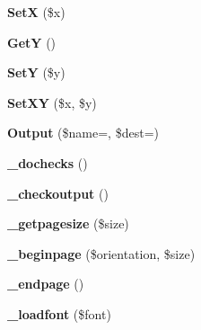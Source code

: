 \begin{DoxyCompactItemize}
\item 
\hypertarget{classFPDF_a2bfd055c0ed78a7929fa17ba64f9cf65}{}{\bfseries Set\+X} (\$x)\label{classFPDF_a2bfd055c0ed78a7929fa17ba64f9cf65}

\item 
\hypertarget{classFPDF_a7a0b514eaa73283268ac14e9f0d7f0c4}{}{\bfseries Get\+Y} ()\label{classFPDF_a7a0b514eaa73283268ac14e9f0d7f0c4}

\item 
\hypertarget{classFPDF_a7a0e004fce75cd2cd3501cf54be632e4}{}{\bfseries Set\+Y} (\$y)\label{classFPDF_a7a0e004fce75cd2cd3501cf54be632e4}

\item 
\hypertarget{classFPDF_a2c191daee30b7ea3a66696bd0be92a3e}{}{\bfseries Set\+X\+Y} (\$x, \$y)\label{classFPDF_a2c191daee30b7ea3a66696bd0be92a3e}

\item 
\hypertarget{classFPDF_ac4e0bfb71d9e602637c67016e4b5dd40}{}{\bfseries Output} (\$name=\textquotesingle{}\textquotesingle{}, \$dest=\textquotesingle{}\textquotesingle{})\label{classFPDF_ac4e0bfb71d9e602637c67016e4b5dd40}

\item 
\hypertarget{classFPDF_a1ce404a00709a07ca9851b91aefbb0c4}{}{\bfseries \+\_\+dochecks} ()\label{classFPDF_a1ce404a00709a07ca9851b91aefbb0c4}

\item 
\hypertarget{classFPDF_aae8f75d4fcd8774b6663c378cf2a32e4}{}{\bfseries \+\_\+checkoutput} ()\label{classFPDF_aae8f75d4fcd8774b6663c378cf2a32e4}

\item 
\hypertarget{classFPDF_aca25fc93dd33864413e1bfb8665ccc2a}{}{\bfseries \+\_\+getpagesize} (\$size)\label{classFPDF_aca25fc93dd33864413e1bfb8665ccc2a}

\item 
\hypertarget{classFPDF_ac1ce0e0dd9cad852a78b4df4db4db3d6}{}{\bfseries \+\_\+beginpage} (\$orientation, \$size)\label{classFPDF_ac1ce0e0dd9cad852a78b4df4db4db3d6}

\item 
\hypertarget{classFPDF_a0c727a46d970b65e123da12e3cb34b58}{}{\bfseries \+\_\+endpage} ()\label{classFPDF_a0c727a46d970b65e123da12e3cb34b58}

\item 
\hypertarget{classFPDF_a17b92aa9a0bf565520693a801edab6aa}{}{\bfseries \+\_\+loadfont} (\$font)\label{classFPDF_a17b92aa9a0bf565520693a801edab6aa}


\end{DoxyCompactItemize}
